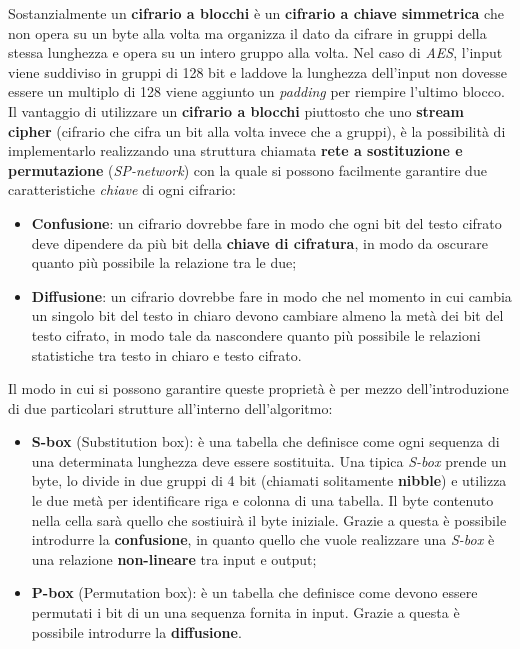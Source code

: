 Sostanzialmente un \textbf{cifrario a blocchi} è un \textbf{cifrario a chiave simmetrica} che non opera su un byte alla volta ma organizza il dato da cifrare in gruppi della stessa lunghezza e opera su un intero gruppo alla volta. Nel caso di \emph{AES}, l'input viene suddiviso in gruppi di 128 bit e laddove la lunghezza dell'input non dovesse essere un multiplo di 128 viene aggiunto un \emph{padding} per riempire l'ultimo blocco.\\
Il vantaggio di utilizzare un \textbf{cifrario a blocchi} piuttosto che uno \textbf{stream cipher} (cifrario che cifra un bit alla volta invece che a gruppi), è la possibilità di implementarlo realizzando una struttura chiamata \textbf{rete a sostituzione e permutazione} (\emph{SP-network}) \cite{wikipedia_aes} con la quale si possono facilmente garantire due caratteristiche \emph{chiave} di ogni cifrario:
\begin{itemize}
    \item \textbf{Confusione}: un cifrario dovrebbe fare in modo che ogni bit del testo cifrato deve dipendere da più bit della \textbf{chiave di cifratura}, in modo da oscurare quanto più possibile la relazione tra le due;
    \item \textbf{Diffusione}: un cifrario dovrebbe fare in modo che nel momento in cui cambia un singolo bit del testo in chiaro devono cambiare almeno la metà dei bit del testo cifrato, in modo tale da nascondere quanto più possibile le relazioni statistiche tra testo in chiaro e testo cifrato. \cite{wikipedia_confusion}
\end{itemize}

Il modo in cui si possono garantire queste proprietà è per mezzo dell'introduzione di due particolari strutture all'interno dell'algoritmo:
\begin{itemize}
    \item \textbf{S-box} (Substitution box): è una tabella che definisce come ogni sequenza di una determinata lunghezza deve essere sostituita. Una tipica \emph{S-box} prende un byte, lo divide in due gruppi di 4 bit (chiamati solitamente \textbf{nibble}) e utilizza le due metà per identificare riga e colonna di una tabella. Il byte contenuto nella cella sarà quello che sostiuirà il byte iniziale. Grazie a questa è possibile introdurre la \textbf{confusione}, in quanto quello che vuole realizzare una \emph{S-box} è una relazione \textbf{non-lineare} tra input e output; \cite{wikipedia_s-box}
    \item \textbf{P-box} (Permutation box): è un tabella che definisce come devono essere permutati i bit di un una sequenza fornita in input. Grazie a questa è possibile introdurre la \textbf{diffusione}. \cite{wikipedia_p-box}
\end{itemize}

